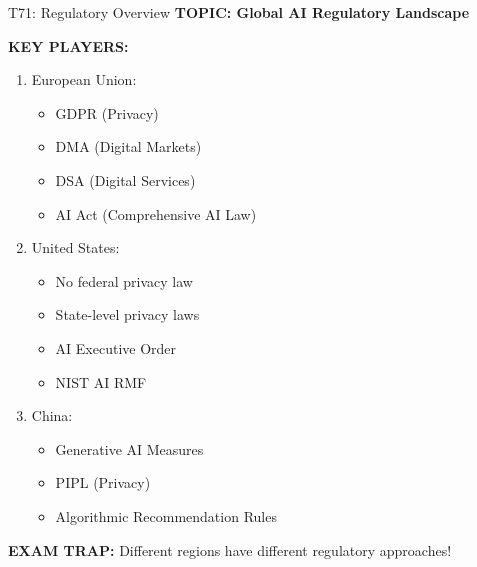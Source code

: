 \documentclass[8pt]{beamer}
\begin{document}
	\begin{frame}{T71: Regulatory Overview}
		\fontsize{6.5}{7.5}\selectfont
		\textbf{TOPIC: Global AI Regulatory Landscape}
		
		\vspace{0.1cm}
		\textbf{KEY PLAYERS:}
		\begin{enumerate}
			\item \textcolor{myblue}{European Union:}
			\begin{itemize}
				\item GDPR (Privacy)
				\item DMA (Digital Markets)
				\item DSA (Digital Services)
				\item AI Act (Comprehensive AI Law)
			\end{itemize}
			\item \textcolor{myblue}{United States:}
			\begin{itemize}
				\item No federal privacy law
				\item State-level privacy laws
				\item AI Executive Order
				\item NIST AI RMF
			\end{itemize}
			\item \textcolor{myblue}{China:}
			\begin{itemize}
				\item Generative AI Measures
				\item PIPL (Privacy)
				\item Algorithmic Recommendation Rules
			\end{itemize}
		\end{enumerate}
		
		\textcolor{myred}{\textbf{EXAM TRAP:}} Different regions have \textcolor{myblue}{different regulatory approaches}!
	\end{frame}
	
\end{document}
